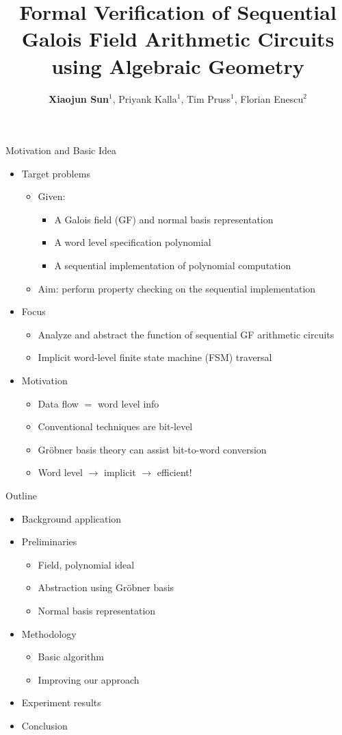 \documentclass[xcolor=dvipsnames]{beamer}
\title[Presentation]{Formal Verification of Sequential Galois Field Arithmetic Circuits using Algebraic Geometry}
\author[Xiaojun Sun]{{\bf Xiaojun Sun}$^1$, Priyank Kalla$^1$, Tim Pruss$^1$, Florian Enescu$^2$}
\institute[Univ. of Utah]{
$^1$Electrical and Computer Engineering, University of Utah, Salt Lake City, USA\\
$^2$Mathematics \& Statistics, Georgia State University, Atlanta, USA\\
\ \\
\{{\bf xiaojuns}, kalla, tpruss\}@ece.utah.edu, fenescu@gsu.edu\\
\ \\
\ \\
{\bf Session 12.2 -- Long Presentation}\\
}
\date{}
\newcommand{\bi}{\begin{itemize}}
\newcommand{\ei}{\end{itemize}}
\begin{document}
\begin{frame}[plain]
  \titlepage

\end{frame}

\begin{frame}{\large{Motivation and Basic Idea}}
\bi
\item Target problems
	\bi
	\item Given:
		\bi
		\item  A Galois field (GF) and normal basis representation
		\item A word level specification polynomial
		\item A sequential implementation of polynomial computation
		\ei
	\item Aim: perform property checking on the sequential implementation
	\ei
\item Focus
	\bi
	\item Analyze and abstract the function of sequential GF arithmetic circuits
	\item Implicit \alert{word-level} finite state machine (FSM) traversal
	\ei
\item Motivation
	\bi
	\item Data flow $=$ word level info
	\item Conventional techniques are bit-level
	\item Gr\"obner basis theory can assist bit-to-word conversion
	\item Word level $\to$ implicit $\to$ efficient!
	\ei
\ei
\end{frame}
\begin{frame}{\large{Outline}}
\bi
\item Background application
\item Preliminaries
	\bi
	\item Field, polynomial ideal
	\item Abstraction using Gr\"obner basis
	\item Normal basis representation
	\ei
\item Methodology
	\bi
	\item Basic algorithm
	\item Improving our approach
	\ei
\item Experiment results
\item Conclusion
\ei
\end{frame}
\end{document}
